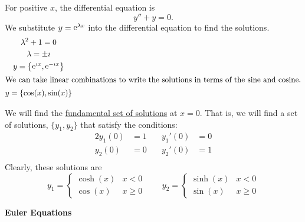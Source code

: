 {\begin{Solution}
  For positive $x$, the differential equation is
  \[
  y'' + y = 0.
  \]
  We substitute $y = \mathop{\mathrm{e}}\nolimits^{\lambda x}$ into the differential equation to find
  the solutions.
  \begin{gather*}
    \lambda^2 + 1 = 0 \\
    \lambda = \pm \imath \\
    y = \left\{ \mathop{\mathrm{e}}\nolimits^{\imath x}, \mathop{\mathrm{e}}\nolimits^{-\imath x} \right\} \\
    \intertext{We can take linear combinations to write the solutions in terms of
      the sine and cosine.}
    y = \left\{ \cos(x), \sin(x) \right\}
  \end{gather*}

  We will find the 
  \hyperref[section The Fundamental Set of Solutions]
    {fundamental set of solutions}
  at $x = 0$.  That is, we will
  find a set of solutions, $\{y_1, y_2\}$ that satisfy the conditions:
  \begin{alignat*}{2}
    y_1(0) &= 1 &\quad y_1'(0) &= 0 \\
    y_2(0) &= 0 &\quad y_2'(0) &= 1 \\
  \end{alignat*}
  Clearly, these solutions are
  \[
  \boxed{
    y_1 = \begin{cases}
      \cosh(x) &x < 0 \\
      \cos(x) &x \geq 0
    \end{cases}
    \qquad
    y_2 = \begin{cases}
      \sinh(x) &x < 0 \\
      \sin(x) &x \geq 0
    \end{cases}
    }
  \]
\end{Solution}








\begin{large}
  \noindent
  \textbf{Euler Equations}
\end{large}








}
